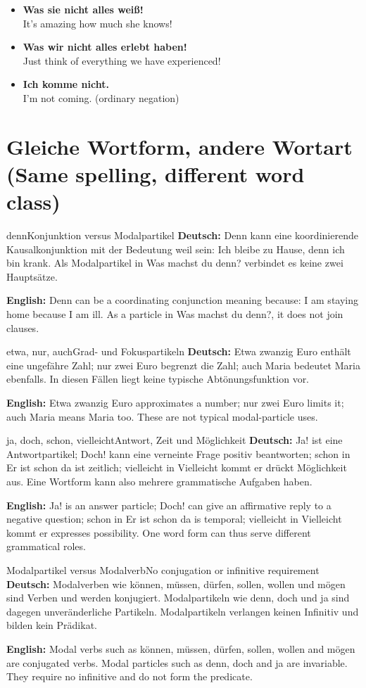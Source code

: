 \documentclass[a4paper,11pt]{article}
\newcommand{\GermanText}[1]{\textbf{Deutsch: }#1\par}
\newcommand{\EnglishText}[1]{{\small\color{SoftGray}\textbf{English: }#1\par}}
\newcommand{\ExampleItem}[2]{\item \textbf{#1}\\{\small\color{SoftGray}#2}}
\begin{document}
\begin{exbox}\begin{itemize}
\ExampleItem{Was sie nicht alles weiß!}{It's amazing how much she knows!}
\ExampleItem{Was wir nicht alles erlebt haben!}{Just think of everything we have experienced!}
\ExampleItem{Ich komme nicht.}{I'm not coming. (ordinary negation)}
\end{itemize}\end{exbox}
\section{Gleiche Wortform, andere Wortart \textnormal{(Same spelling, different word class)}}
\begin{grammarentry}{denn}{Konjunktion versus Modalpartikel}
\GermanText{Denn kann eine koordinierende Kausalkonjunktion mit der Bedeutung weil sein: Ich bleibe zu Hause, denn ich bin krank. Als Modalpartikel in Was machst du denn? verbindet es keine zwei Hauptsätze.}
\EnglishText{Denn can be a coordinating conjunction meaning because: I am staying home because I am ill. As a particle in Was machst du denn?, it does not join clauses.}
\end{grammarentry}
\begin{grammarentry}{etwa, nur, auch}{Grad- und Fokuspartikeln}
\GermanText{Etwa zwanzig Euro enthält eine ungefähre Zahl; nur zwei Euro begrenzt die Zahl; auch Maria bedeutet Maria ebenfalls. In diesen Fällen liegt keine typische Abtönungsfunktion vor.}
\EnglishText{Etwa zwanzig Euro approximates a number; nur zwei Euro limits it; auch Maria means Maria too. These are not typical modal-particle uses.}
\end{grammarentry}
\begin{grammarentry}{ja, doch, schon, vielleicht}{Antwort, Zeit und Möglichkeit}
\GermanText{Ja! ist eine Antwortpartikel; Doch! kann eine verneinte Frage positiv beantworten; schon in Er ist schon da ist zeitlich; vielleicht in Vielleicht kommt er drückt Möglichkeit aus. Eine Wortform kann also mehrere grammatische Aufgaben haben.}
\EnglishText{Ja! is an answer particle; Doch! can give an affirmative reply to a negative question; schon in Er ist schon da is temporal; vielleicht in Vielleicht kommt er expresses possibility. One word form can thus serve different grammatical roles.}
\end{grammarentry}
\begin{grammarentry}{Modalpartikel versus Modalverb}{No conjugation or infinitive requirement}
\GermanText{Modalverben wie können, müssen, dürfen, sollen, wollen und mögen sind Verben und werden konjugiert. Modalpartikeln wie denn, doch und ja sind dagegen unveränderliche Partikeln. Modalpartikeln verlangen keinen Infinitiv und bilden kein Prädikat.}
\EnglishText{Modal verbs such as können, müssen, dürfen, sollen, wollen and mögen are conjugated verbs. Modal particles such as denn, doch and ja are invariable. They require no infinitive and do not form the predicate.}
\end{grammarentry}
\end{document}
